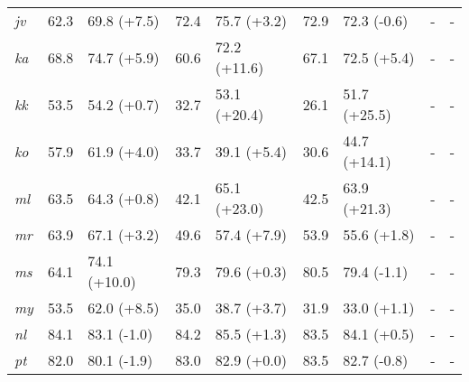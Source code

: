 \documentclass[11pt,dvipsnames]{article}
\begin{document}
\begin{table*}[ht!]
\begin{tabular}{lcccccccccccc}
\textit{jv}&62.3&\multicolumn{2}{l}{\cellcolor[HTML]{7DCEA0} 69.8 (+7.5)}&72.4&\multicolumn{2}{l}{\cellcolor[HTML]{A9DFBF} 75.7 (+3.2)}&72.9&\multicolumn{2}{l}{\cellcolor[HTML]{FDEDEC} 72.3 (-0.6)}&-&\multicolumn{2}{l}{-}\\
\textit{ka}&68.8&\multicolumn{2}{l}{\cellcolor[HTML]{7DCEA0} 74.7 (+5.9)}&60.6&\multicolumn{2}{l}{\cellcolor[HTML]{52BE80} 72.2 (+11.6)}&67.1&\multicolumn{2}{l}{\cellcolor[HTML]{7DCEA0} 72.5 (+5.4)}&-&\multicolumn{2}{l}{-}\\
\textit{kk}&53.5&\multicolumn{2}{l}{\cellcolor[HTML]{E9F7EF} 54.2 (+0.7)}&32.7&\multicolumn{2}{l}{\cellcolor[HTML]{52BE80} 53.1 (+20.4)}&26.1&\multicolumn{2}{l}{\cellcolor[HTML]{52BE80} 51.7 (+25.5)}&-&\multicolumn{2}{l}{-}\\
\textit{ko}&57.9&\multicolumn{2}{l}{\cellcolor[HTML]{A9DFBF} 61.9 (+4.0)}&33.7&\multicolumn{2}{l}{\cellcolor[HTML]{7DCEA0} 39.1 (+5.4)}&30.6&\multicolumn{2}{l}{\cellcolor[HTML]{52BE80} 44.7 (+14.1)}&-&\multicolumn{2}{l}{-}\\
\textit{ml}&63.5&\multicolumn{2}{l}{\cellcolor[HTML]{E9F7EF} 64.3 (+0.8)}&42.1&\multicolumn{2}{l}{\cellcolor[HTML]{52BE80} 65.1 (+23.0)}&42.5&\multicolumn{2}{l}{\cellcolor[HTML]{52BE80} 63.9 (+21.3)}&-&\multicolumn{2}{l}{-}\\
\textit{mr}&63.9&\multicolumn{2}{l}{\cellcolor[HTML]{A9DFBF} 67.1 (+3.2)}&49.6&\multicolumn{2}{l}{\cellcolor[HTML]{7DCEA0} 57.4 (+7.9)}&53.9&\multicolumn{2}{l}{\cellcolor[HTML]{A9DFBF} 55.6 (+1.8)}&-&\multicolumn{2}{l}{-}\\
\textit{ms}&64.1&\multicolumn{2}{l}{\cellcolor[HTML]{52BE80} 74.1 (+10.0)}&79.3&\multicolumn{2}{l}{\cellcolor[HTML]{E9F7EF} 79.6 (+0.3)}&80.5&\multicolumn{2}{l}{\cellcolor[HTML]{FADBD8} 79.4 (-1.1)}&-&\multicolumn{2}{l}{-}\\
\textit{my}&53.5&\multicolumn{2}{l}{\cellcolor[HTML]{7DCEA0} 62.0 (+8.5)}&35.0&\multicolumn{2}{l}{\cellcolor[HTML]{A9DFBF} 38.7 (+3.7)}&31.9&\multicolumn{2}{l}{\cellcolor[HTML]{A9DFBF} 33.0 (+1.1)}&-&\multicolumn{2}{l}{-}\\
\textit{nl}&84.1&\multicolumn{2}{l}{\cellcolor[HTML]{FADBD8} 83.1 (-1.0)}&84.2&\multicolumn{2}{l}{\cellcolor[HTML]{A9DFBF} 85.5 (+1.3)}&83.5&\multicolumn{2}{l}{\cellcolor[HTML]{E9F7EF} 84.1 (+0.5)}&-&\multicolumn{2}{l}{-}\\
\textit{pt}&82.0&\multicolumn{2}{l}{\cellcolor[HTML]{FADBD8} 80.1 (-1.9)}&83.0&\multicolumn{2}{l}{82.9 (+0.0)}&83.5&\multicolumn{2}{l}{\cellcolor[HTML]{FDEDEC} 82.7 (-0.8)}&-&\multicolumn{2}{l}{-}\\

\end{tabular}
\end{table*}
\end{document}
